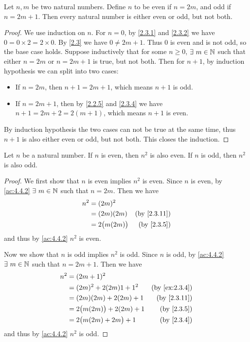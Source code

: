 \begin{ac}\label{ac:4.4.2}
  Let \(n, m\) be two natural numbers.
  Define \(n\) to be even if \(n = 2m\), and odd if \(n = 2m + 1\).
  Then every natural number is either even or odd, but not both.
\end{ac}

\begin{proof}
  We use induction on \(n\).
  For \(n = 0\), by \cref{2.3.1} and \cref{2.3.2} we have \(0 = 0 \times 2 = 2 \times 0\).
  By \cref{2.3} we have \(0 \neq 2m + 1\).
  Thus \(0\) is even and is not odd, so the base case holds.
  Suppose inductively that for some \(n \geq 0\), \(\exists\ m \in \mathbb{N}\) such that either \(n = 2m\) or \(n = 2m + 1\) is true, but not both.
  Then for \(n + 1\), by induction hypothesis we can split into two cases:
  \begin{itemize}
    \item If \(n = 2m\), then \(n + 1 = 2m + 1\), which means \(n + 1\) is odd.
    \item If \(n = 2m + 1\), then by \cref{2.2.5} and \cref{2.3.4} we have \(n + 1 = 2m + 2 = 2(m + 1)\), which means \(n + 1\) is even.
  \end{itemize}
  By induction hypothesis the two cases can not be true at the same time, thus \(n + 1\) is also either even or odd, but not both.
  This closes the induction.
\end{proof}

\begin{ac}\label{ac:4.4.3}
  Let \(n\) be a natural number.
  If \(n\) is even, then \(n^2\) is also even.
  If \(n\) is odd, then \(n^2\) is also odd.
\end{ac}

\begin{proof}
  We first show that \(n\) is even implies \(n^2\) is even.
  Since \(n\) is even, by \cref{ac:4.4.2} \(\exists\ m \in \mathbb{N}\) such that \(n = 2m\).
  Then we have
  \begin{align*}
    n^2 & = (2m)^2                                       \\
        & = (2m)(2m)         & \text{(by \cref{2.3.11})} \\
        & = 2\big(m(2m)\big) & \text{(by \cref{2.3.5})}
  \end{align*}
  and thus by \cref{ac:4.4.2} \(n^2\) is even.

  Now we show that \(n\) is odd implies \(n^2\) is odd.
  Since \(n\) is odd, by \cref{ac:4.4.2} \(\exists\ m \in \mathbb{N}\) such that \(n = 2m + 1\).
  Then we have
  \begin{align*}
    n^2 & = (2m + 1)^2                                                 \\
        & = (2m)^2 + 2(2m)1 + 1^2        & \text{(by \cref{ex:2.3.4})} \\
        & = (2m)(2m) + 2(2m) + 1         & \text{(by \cref{2.3.11})}   \\
        & = 2\big(m(2m)\big) + 2(2m) + 1 & \text{(by \cref{2.3.5})}    \\
        & = 2\big(m(2m) + 2m\big) + 1    & \text{(by \cref{2.3.4})}
  \end{align*}
  and thus by \cref{ac:4.4.2} \(n^2\) is odd.
\end{proof}

